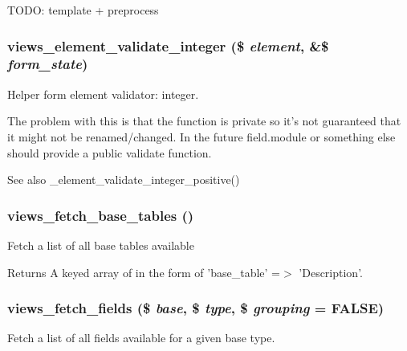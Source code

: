 TODO: template + preprocess \hypertarget{admin_8inc_a31abc35bd1848799b48a57136d0ab330}{
\subsubsection[{views\_\-element\_\-validate\_\-integer}]{\setlength{\rightskip}{0pt plus 5cm}views\_\-element\_\-validate\_\-integer (\$ {\em element}, \/  \&\$ {\em form\_\-state})}}
\label{admin_8inc_a31abc35bd1848799b48a57136d0ab330}
Helper form element validator: integer.

The problem with this is that the function is private so it's not guaranteed that it might not be renamed/changed. In the future field.module or something else should provide a public validate function.

\begin{DoxySeeAlso}{See also}
\_\-element\_\-validate\_\-integer\_\-positive() 
\end{DoxySeeAlso}
\hypertarget{admin_8inc_a36ed4b1513b45a8a358d2cb3fb287d06}{
\subsubsection[{views\_\-fetch\_\-base\_\-tables}]{\setlength{\rightskip}{0pt plus 5cm}views\_\-fetch\_\-base\_\-tables ()}}
\label{admin_8inc_a36ed4b1513b45a8a358d2cb3fb287d06}
Fetch a list of all base tables available

\begin{DoxyReturn}{Returns}
A keyed array of in the form of 'base\_\-table' =$>$ 'Description'. 
\end{DoxyReturn}
\hypertarget{admin_8inc_afae9fab40ab9d39b71644d2bb27d2703}{
\subsubsection[{views\_\-fetch\_\-fields}]{\setlength{\rightskip}{0pt plus 5cm}views\_\-fetch\_\-fields (\$ {\em base}, \/  \$ {\em type}, \/  \$ {\em grouping} = {\ttfamily FALSE})}}
\label{admin_8inc_afae9fab40ab9d39b71644d2bb27d2703}
Fetch a list of all fields available for a given base type.


